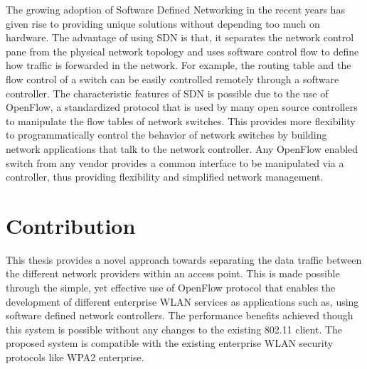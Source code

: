 The growing adoption of Software Defined Networking in the recent years has given rise to providing unique solutions without depending too much on hardware. The advantage of using SDN is that, it separates the network control pane from the physical network topology and uses software control flow to define how traffic is forwarded in the network. For example, the routing table and the flow control of a switch can be easily controlled remotely through a software controller. The characteristic features of SDN is possible due to the use of OpenFlow, a standardized protocol that is used by many open source controllers to manipulate the flow tables of network switches. This provides more flexibility to programmatically control the behavior of network switches by building network applications that talk to the network controller. Any OpenFlow enabled switch from any vendor provides a common interface to be manipulated via a controller, thus providing flexibility and simplified network management.


\section{Contribution}\label{sec:contribution}

This thesis provides a novel approach towards separating the data traffic between the different network providers within an access point. This is made possible through the simple, yet effective use of OpenFlow protocol that enables the development of different enterprise WLAN services as applications such as, using software defined network controllers. The performance benefits achieved though this system is possible without any changes to the existing 802.11 client. The proposed system is compatible with the existing enterprise WLAN security protocols like WPA2 enterprise.

